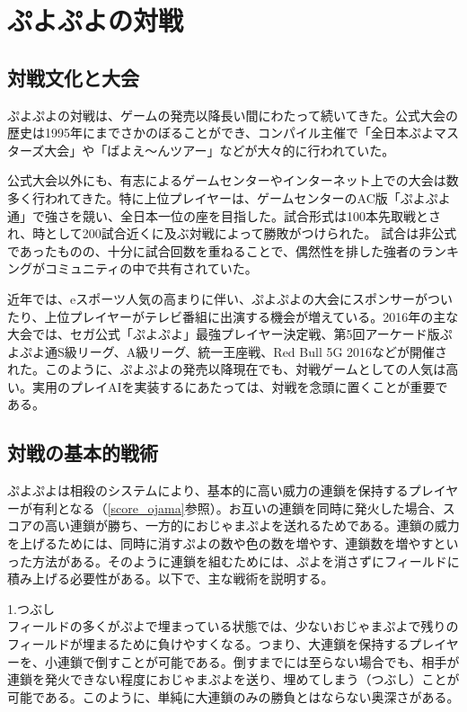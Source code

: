 \documentclass[12pt]{jreport}
\begin{document}
\section{ぷよぷよの対戦}
\subsection{対戦文化と大会}
ぷよぷよの対戦は、ゲームの発売以降長い間にわたって続いてきた。公式大会の歴史は1995年にまでさかのぼることができ、コンパイル主催で「全日本ぷよマスターズ大会」や「ばよえ～んツアー」などが大々的に行われていた。

公式大会以外にも、有志によるゲームセンターやインターネット上での大会は数多く行われてきた。特に上位プレイヤーは、ゲームセンターのAC版「ぷよぷよ通」で強さを競い、全日本一位の座を目指した。試合形式は100本先取戦とされ、時として200試合近くに及ぶ対戦によって勝敗がつけられた。
試合は非公式であったものの、十分に試合回数を重ねることで、偶然性を排した強者のランキングがコミュニティの中で共有されていた。

近年では、eスポーツ人気の高まりに伴い、ぷよぷよの大会にスポンサーがついたり、上位プレイヤーがテレビ番組に出演する機会が増えている。2016年の主な大会では、セガ公式「ぷよぷよ」最強プレイヤー決定戦\cite{sega}、第5回アーケード版ぷよぷよ通S級リーグ\cite{Skyuu}、A級リーグ\cite{Akyuu}、統一王座戦\cite{touituouza}、Red Bull 5G 2016\cite{5g}などが開催された。このように、ぷよぷよの発売以降現在でも、対戦ゲームとしての人気は高い。実用のプレイAIを実装するにあたっては、対戦を念頭に置くことが重要である。

\subsection{対戦の基本的戦術} \label{senzyutu}
ぷよぷよは相殺のシステムにより、基本的に高い威力の連鎖を保持するプレイヤーが有利となる（\ref{score_ojama}参照）。お互いの連鎖を同時に発火した場合、スコアの高い連鎖が勝ち、一方的におじゃまぷよを送れるためである。連鎖の威力を上げるためには、同時に消すぷよの数や色の数を増やす、連鎖数を増やすといった方法がある。そのように連鎖を組むためには、ぷよを消さずにフィールドに積み上げる必要性がある。以下で、主な戦術を説明する。

1.つぶし\\
フィールドの多くがぷよで埋まっている状態では、少ないおじゃまぷよで残りのフィールドが埋まるために負けやすくなる。つまり、大連鎖を保持するプレイヤーを、小連鎖で倒すことが可能である。倒すまでには至らない場合でも、相手が連鎖を発火できない程度におじゃまぷよを送り、埋めてしまう（つぶし）ことが可能である。このように、単純に大連鎖のみの勝負とはならない奥深さがある。
\end{document}

